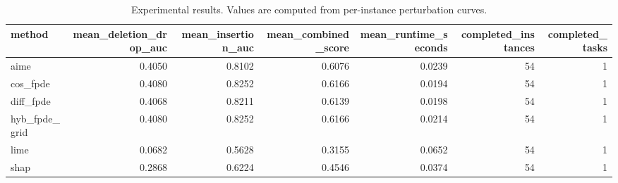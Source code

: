 \begin{table}[t]
\caption{Experimental results. Values are computed from per-instance perturbation curves.}
\label{tab:main_results_computed}
\centering
\begin{tabular}{lrrrrrr}
\toprule
method & mean\_deletion\_drop\_auc & mean\_insertion\_auc & mean\_combined\_score & mean\_runtime\_seconds & completed\_instances & completed\_tasks \\
\midrule
aime & 0.4050 & 0.8102 & 0.6076 & 0.0239 & 54 & 1 \\
cos\_fpde & 0.4080 & 0.8252 & 0.6166 & 0.0194 & 54 & 1 \\
diff\_fpde & 0.4068 & 0.8211 & 0.6139 & 0.0198 & 54 & 1 \\
hyb\_fpde\_grid & 0.4080 & 0.8252 & 0.6166 & 0.0214 & 54 & 1 \\
lime & 0.0682 & 0.5628 & 0.3155 & 0.0652 & 54 & 1 \\
shap & 0.2868 & 0.6224 & 0.4546 & 0.0374 & 54 & 1 \\
\bottomrule
\end{tabular}

\end{table}
